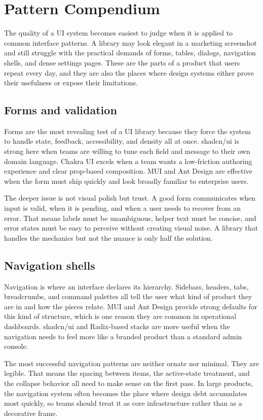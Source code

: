 \documentclass[11pt,twoside,a4paper]{article}
\begin{document}
\section{Pattern Compendium}
The quality of a UI system becomes easiest to judge when it is applied to common interface patterns. A library may look elegant in a marketing screenshot and still struggle with the practical demands of forms, tables, dialogs, navigation shells, and dense settings pages. These are the parts of a product that users repeat every day, and they are also the places where design systems either prove their usefulness or expose their limitations.

\subsection{Forms and validation}
Forms are the most revealing test of a UI library because they force the system to handle state, feedback, accessibility, and density all at once. shadcn/ui is strong here when teams are willing to tune each field and message to their own domain language. Chakra UI excels when a team wants a low-friction authoring experience and clear prop-based composition. MUI and Ant Design are effective when the form must ship quickly and look broadly familiar to enterprise users.

The deeper issue is not visual polish but trust. A good form communicates when input is valid, when it is pending, and when a user needs to recover from an error. That means labels must be unambiguous, helper text must be concise, and error states must be easy to perceive without creating visual noise. A library that handles the mechanics but not the nuance is only half the solution.

\subsection{Navigation shells}
Navigation is where an interface declares its hierarchy. Sidebars, headers, tabs, breadcrumbs, and command palettes all tell the user what kind of product they are in and how the pieces relate. MUI and Ant Design provide strong defaults for this kind of structure, which is one reason they are common in operational dashboards. shadcn/ui and Radix-based stacks are more useful when the navigation needs to feel more like a branded product than a standard admin console.

The most successful navigation patterns are neither ornate nor minimal. They are legible. That means the spacing between items, the active-state treatment, and the collapse behavior all need to make sense on the first pass. In large products, the navigation system often becomes the place where design debt accumulates most quickly, so teams should treat it as core infrastructure rather than as a decorative frame.
\end{document}
